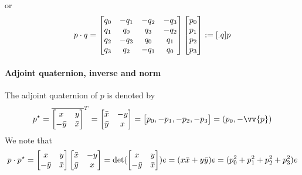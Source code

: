 or
\begin{equation}
  \label{eq:77}
  p \cdot q  =
  \begin{bmatrix}
    q_0 & -q_1 & -q_2 & -q_3 \\
    q_1 & q_0 & q_3 & -q_2 \\
    q_2 & -q_3 & q_0 & q_1 \\
    q_3 & q_2 & -q_1 & q_0 \\
  \end{bmatrix}
  \begin{bmatrix}
    p_0\\
    p_1\\
    p_2\\
    p_3
  \end{bmatrix} := [{}_\cdot q] p
\end{equation}

\paragraph{Adjoint quaternion, inverse and norm}
The adjoint quaternion of $p$ is denoted by
\begin{equation}
  p^\star = \overline{  \begin{bmatrix}
      x &y  \\
      - \bar y  & \bar x
    \end{bmatrix}}^T
  =\begin{bmatrix}
    \bar x & - y  \\
    \bar y  &  x
  \end{bmatrix} =
  \begin{bmatrix}
    p_0, -p_1, -p_2, -p_3
  \end{bmatrix} = (p_0, - \vv{p})
\end{equation}
We note that
\begin{equation}
  \label{eq:131}
  p \cdot p^\star =
  \begin{bmatrix}
      x &y  \\
      - \bar y  & \bar x
    \end{bmatrix}
    \begin{bmatrix}
    \bar x & - y  \\
    \bar y  &  x
  \end{bmatrix} = \det(\begin{bmatrix}
      x &y  \\
      - \bar y  & \bar x
    \end{bmatrix}) e = (x\bar x + y \bar y) e  = (p^2_0 + p^2_1+ p_2^2 + p_3^2)e
\end{equation}


